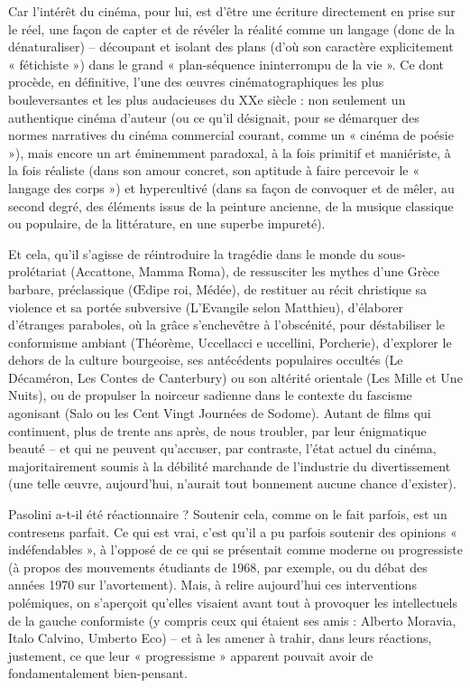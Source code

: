 \documentclass[a4paper,twocolumn]{article}
\begin{document}
Car l’intérêt du cinéma, pour lui, est d’être une écriture directement en prise sur le réel, une façon de capter et de révéler la réalité comme un langage (donc de la dénaturaliser) – découpant et isolant des plans (d’où son caractère explicitement « fétichiste ») dans le grand « plan-séquence ininterrompu de la vie ». Ce dont procède, en définitive, l’une des œuvres cinématographiques les plus bouleversantes et les plus audacieuses du XXe siècle : non seulement un authentique cinéma d’auteur (ou ce qu’il désignait, pour se démarquer des normes narratives du cinéma commercial courant, comme un « cinéma de poésie »), mais encore un art éminemment paradoxal, à la fois primitif et maniériste, à la fois réaliste (dans son amour concret, son aptitude à faire percevoir le « langage des corps ») et hypercultivé (dans sa façon de convoquer et de mêler, au second degré, des éléments issus de la peinture ancienne, de la musique classique ou populaire, de la littérature, en une superbe impureté).

Et cela, qu’il s’agisse de réintroduire la tragédie dans le monde du sous-prolétariat (Accattone, Mamma Roma), de ressusciter les mythes d’une Grèce barbare, préclassique (Œdipe roi, Médée), de restituer au récit christique sa violence et sa portée subversive (L’Evangile selon Matthieu), d’élaborer d’étranges paraboles, où la grâce s’enchevêtre à l’obscénité, pour déstabiliser le conformisme ambiant (Théorème, Uccellacci e uccellini, Porcherie), d’explorer le dehors de la culture bourgeoise, ses antécédents populaires occultés (Le Décaméron, Les Contes de Canterbury) ou son altérité orientale (Les Mille et Une Nuits), ou de propulser la noirceur sadienne dans le contexte du fascisme agonisant (Salo ou les Cent Vingt Journées de Sodome). Autant de films qui continuent, plus de trente ans après, de nous troubler, par leur énigmatique beauté – et qui ne peuvent qu’accuser, par contraste, l’état actuel du cinéma, majoritairement soumis à la débilité marchande de l’industrie du divertissement (une telle œuvre, aujourd’hui, n’aurait tout bonnement aucune chance d’exister).

Pasolini a-t-il été réactionnaire ? Soutenir cela, comme on le fait parfois, est un contresens parfait. Ce qui est vrai, c’est qu’il a pu parfois soutenir des opinions « indéfendables », à l’opposé de ce qui se présentait comme moderne ou progressiste (à propos des mouvements étudiants de 1968, par exemple, ou du débat des années 1970 sur l’avortement). Mais, à relire aujourd’hui ces interventions polémiques, on s’aperçoit qu’elles visaient avant tout à provoquer les intellectuels de la gauche conformiste (y compris ceux qui étaient ses amis : Alberto Moravia, Italo Calvino, Umberto Eco) – et à les amener à trahir, dans leurs réactions, justement, ce que leur « progressisme » apparent pouvait avoir de fondamentalement bien-pensant.
\end{document}
